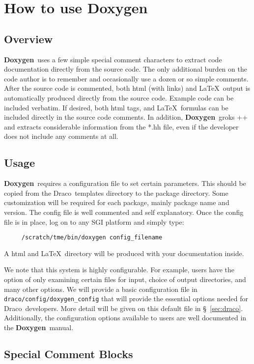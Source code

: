 \documentclass[11pt]{nmemo}
\newcommand{\draco}{{\normalfont\sffamily Draco}}
\newcommand{\doxy}{{\normalfont\bfseries Doxygen}}
\begin{document}
\section{How to use \doxy\ }

\subsection{Overview}

\doxy\ uses a few simple special comment characters to extract code
documentation directly from the source code. The only additional burden
on the code author is to remember and occasionally use a dozen or so
simple comments. After the source code is commented, both html (with links)
and \LaTeX\ output is automatically produced directly from the source code.
Example code can be included verbatim. If desired, both  html tags, and \LaTeX\
formulas can be included directly in the source code comments. In addition,
\doxy\ groks \C++ and extracts considerable information from the *.hh
file, even if the developer does not include any comments at all.

\subsection{Usage}

\doxy\ requires a configuration file to set certain parameters. This
should be copied from the \draco\ templates directory to the package
directory.  Some customization will be required for each package,
mainly package name and version. The config file is well commented and
self explanatory. Once the config file is in place, log on to any SGI
platform and simply type:
\begin{verbatim} 
     /scratch/tme/bin/doxygen config_filename
\end{verbatim}
A html and \LaTeX\ directory will be produced with your documentation 
inside.  

We note that this system is highly configurable.  For example, users
have the option of only examining certain files for input, choice of
output directories, and many other options.  We will provide a basic
configuration file in \texttt{draco/config/doxygen\_config} that will
provide the essential options needed for \draco\ developers.  More
detail will be given on this default file in \S~\ref{sec:draco}.
Additionally, the configuration options available to users are well
documented in the \doxy\ manual.

\subsection{Special Comment Blocks}
\label{sec:spcom}
\end{document}
